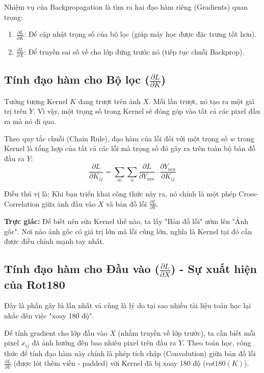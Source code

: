 \documentclass[11pt]{article}
\begin{document}
Nhiệm vụ của Backpropagation là tìm ra hai đạo hàm riêng (Gradients) quan trọng:
\begin{enumerate}
    \item $\frac{\partial L}{\partial K}$: Để cập nhật trọng số của bộ lọc (giúp máy học được đặc trưng tốt hơn).
    \item $\frac{\partial L}{\partial X}$: Để truyền sai số về cho lớp đứng trước nó (tiếp tục chuỗi Backprop).
\end{enumerate}

\subsection{Tính đạo hàm cho Bộ lọc ($\frac{\partial L}{\partial K}$)}
Tưởng tượng Kernel $K$ đang trượt trên ảnh $X$. Mỗi lần trượt, nó tạo ra một giá trị trên $Y$. Vì vậy, một trọng số trong Kernel sẽ đóng góp vào tất cả các pixel đầu ra mà nó đi qua.

Theo quy tắc chuỗi (Chain Rule), đạo hàm của lỗi đối với một trọng số $w$ trong Kernel là tổng hợp của tất cả các lỗi mà trọng số đó gây ra trên toàn bộ bản đồ đầu ra $Y$:
$$ \frac{\partial L}{\partial K_{ij}} = \sum_{m} \sum_{n} \frac{\partial L}{\partial Y_{mn}} \cdot \frac{\partial Y_{mn}}{\partial K_{ij}} $$

Điều thú vị là: Khi bạn triển khai công thức này ra, nó chính là một phép Cross-Correlation giữa ảnh đầu vào $X$ và bản đồ lỗi $\frac{\partial L}{\partial Y}$.
\begin{summarybox}
\textbf{Trực giác:} Để biết nên sửa Kernel thế nào, ta lấy "Bản đồ lỗi" ướm lên "Ảnh gốc". Nơi nào ảnh gốc có giá trị lớn mà lỗi cũng lớn, nghĩa là Kernel tại đó cần được điều chỉnh mạnh tay nhất.
\end{summarybox}

\subsection{Tính đạo hàm cho Đầu vào ($\frac{\partial L}{\partial X}$) - Sự xuất hiện của Rot180}
Đây là phần gây lú lẫn nhất và cũng là lý do tại sao nhiều tài liệu toán học lại nhắc đến việc "xoay 180 độ".

Để tính gradient cho lớp đầu vào $X$ (nhằm truyền về lớp trước), ta cần biết mỗi pixel $x_{ij}$ đã ảnh hưởng đến bao nhiêu pixel trên đầu ra $Y$.
Theo toán học, công thức để tính đạo hàm này chính là phép tích chập (Convolution) giữa bản đồ lỗi $\frac{\partial L}{\partial Y}$ (được lót thêm viền - padded) với Kernel đã bị xoay 180 độ ($rot180(K)$).
\end{document}
